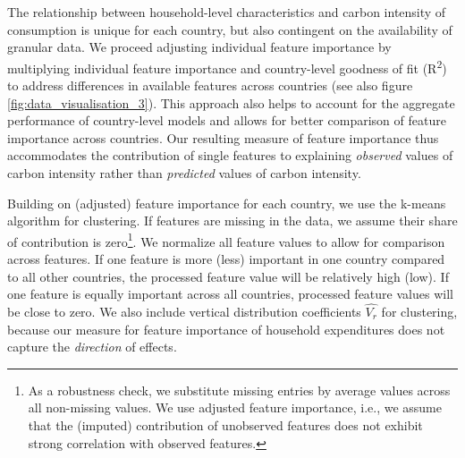 \documentclass[12pt, a4paper]{article}
\begin{document}
The relationship between household-level characteristics and carbon intensity of consumption is unique for each country, but also contingent on the availability of granular data. We proceed adjusting individual feature importance by multiplying individual feature importance and country-level goodness of fit (R\textsuperscript{2}) to address differences in available features across countries (see also figure \ref{fig:data_visualisation_3}). This approach also helps to account for the aggregate performance of country-level models and allows for better comparison of feature importance across countries. Our resulting measure of feature importance thus accommodates the contribution of single features to explaining \textit{observed} values of carbon intensity rather than \textit{predicted} values of carbon intensity.

Building on (adjusted) feature importance for each country, we use the k-means algorithm for clustering. If features are missing in the data, we assume their share of contribution is zero\footnote{As a robustness check, we substitute missing entries by average values across all non-missing values. We use adjusted feature importance, i.e., we assume that the (imputed) contribution of unobserved features does not exhibit strong correlation with observed features.}. We normalize all feature values to allow for comparison across features. If one feature is more (less) important in one country compared to all other countries, the processed feature value will be relatively high (low). If one feature is equally important across all countries, processed feature values will be close to zero. We also include vertical distribution coefficients $\widehat{V_{r}}$ for clustering, because our measure for feature importance of household expenditures does not capture the \textit{direction} of effects.
\end{document}
